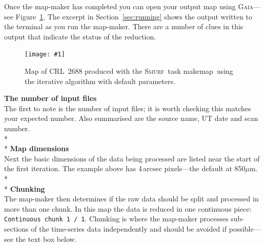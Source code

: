 \documentclass[twoside,11pt]{article}
\newcommand{\htmladdimg}[1]{}
\newcommand{\htmlref}[2]{#1}
\newenvironment{latexonly}{}{}
\newcommand{\html}[1]{}
\newcommand{\latexhtml}[2]{#1}
\newcommand{\xref}[3]{#1}
\renewcommand{\_}{\texttt{\symbol{95}}}
\newcommand{\gaia}{\xref{\textsc{Gaia}}{sun214}{}}
\newcommand{\smurf}{\xref{\textsc{Smurf}}{sun258}{}}
\newcommand{\task}[1]{\textsf{#1}}
\newcommand{\param}[1]{\texttt{#1}}
\newcommand{\makemap}{\xref{\task{makemap}}{sun258}{MAKEMAP}}
\newcommand{\myfig}[6]{
  \begin{figure}#2
    \centering\texttt{[image: \#1]}
    \typeout{#1 inserted on page \arabic{page}}
    \caption[#5]{\label{#4}\small #6}
  \end{figure}
}
\newcommand{\myfig}[6]{
    \label{#4} \htmladdimg{#1.png}\\
    \\
    Figure: #6\\
  }
\newcommand{\cref}[3]{\latexhtml{#1~\ref{#2}}{\htmlref{#3}{#2}}}
\begin{document}
Once the map-maker has completed you can open your output map using
\gaia---see \cref{Figure}{fig:itermap}{this example}. The excerpt
in \cref{Section}{sec:running}{Running the iterative map-maker} shows
the output written to the terminal as you run the map-maker. There are
a number of clues in this output that indicate the status of the
reduction.
\begin{latexonly}
\myfig{sc21_crl2688}{[t!]}{width=0.7\linewidth}{fig:itermap}{
  CRL~2688 produced with \makemap}{
  Map of CRL~2688 produced with the \smurf\ task \makemap\ using the
  iterative algorithm with default parameters.
}
\end{latexonly}
\newline\newline
\textbf{The number of input files}\\
The first to note is the number of input files; it is worth checking
this matches your expected number. Also summarised are the source
name, UT date and scan number.
\\*\\*
\textbf{Map dimensions}\\
Next the basic dimensions of the data being processed are listed near
the start of the first iteration. The example above has 4\,arcsec
pixels---the default at 850$\mu$m.
\\*\\*
\textbf{Chunking}\label{box:chunk}\\
The map-maker then determines if the raw data should be split and
processed in more than one chunk. In this map the data is reduced in
one continuous piece: \param{Continuous chunk 1 / 1}. Chunking is
where the map-maker processes sub-sections of the time-series data
independently and should be avoided if possible---see the text box
below.
\html{\newline}

\begin{htmlonly}
\htmladdimg{sc21_data_chunking.png}
\newline\newline
\end{htmlonly}
\end{document}
